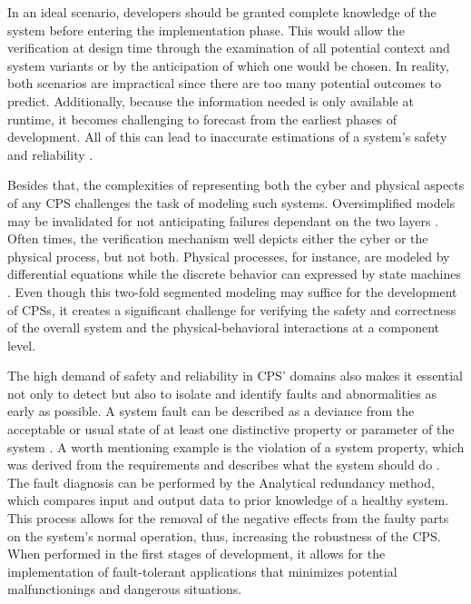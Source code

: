 In an ideal scenario, developers should be granted complete knowledge of the system before entering the implementation phase. This would allow the verification at design time through the examination of all potential context and system variants or by the anticipation of which one would be chosen. In reality, both scenarios are impractical since there are too many potential outcomes to predict. Additionally, because the information needed is only available at runtime, it becomes challenging to forecast from the earliest phases of development. All of this can lead to inaccurate estimations of a system's safety and reliability \cite{2014PerceptionsSOTAV&VCPS}.

Besides that, the complexities of representing both the cyber and physical aspects of any CPS challenges the task of modeling such systems. Oversimplified models may be invalidated for not anticipating failures dependant on the two layers \cite{2014PerceptionsSOTAV&VCPS}. Often times, the verification mechanism well depicts either the cyber or the physical process, but not both. Physical processes, for instance, are modeled by differential equations while the discrete behavior can expressed by state machines \cite{Baheti2019CyberPhysicalS}. Even though this two-fold segmented modeling may suffice for the development of CPSs, it creates a significant challenge for verifying the safety and correctness of the overall system and the physical-behavioral interactions at a component level.

The high demand of safety and reliability in CPS' domains also makes it essential not only to detect but also to isolate and identify faults and abnormalities as early as possible. A system fault can be described as a deviance from the acceptable or usual state of at least one distinctive property or parameter of the system \cite{gao2015survey}. A worth mentioning example is the violation of a system property, which was derived from the requirements and describes what the system should do \cite{2008PrinciplesModelChecking}. The fault diagnosis can be performed by the Analytical redundancy method, which compares input and output data to prior knowledge of a healthy system. This process allows for the removal of the negative effects from the faulty parts on the system's normal operation, thus, increasing the robustness of the CPS. When performed in the first stages of development, it allows for the implementation of fault-tolerant applications that minimizes potential malfunctionings and dangerous situations.

